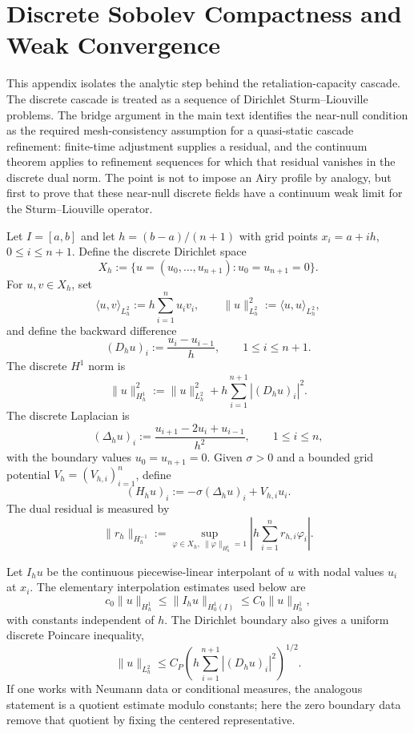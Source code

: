 
\section{Discrete Sobolev Compactness and Weak Convergence}
\label{app:discrete-cascade-compactness}

This appendix isolates the analytic step behind the retaliation-capacity
cascade.  The discrete cascade is treated as a sequence of Dirichlet
Sturm--Liouville problems.  The bridge argument in the main text identifies the
near-null condition as the required mesh-consistency assumption for a
quasi-static cascade refinement: finite-time adjustment supplies a residual, and
the continuum theorem applies to refinement sequences for which that residual
vanishes in the discrete dual norm.  The point is not to impose an Airy profile
by analogy, but first to prove that these near-null discrete fields have a
continuum weak limit for the Sturm--Liouville operator.

Let $I=[a,b]$ and let $h=(b-a)/(n+1)$ with grid points
$x_i=a+ih$, $0\le i\le n+1$.  Define the discrete Dirichlet space
\[
  X_h
  :=
  \{u=(u_0,\ldots,u_{n+1}) : u_0=u_{n+1}=0\}.
\]
For $u,v\in X_h$, set
\[
  \langle u,v\rangle_{L_h^2}
  :=
  h\sum_{i=1}^n u_i v_i,
  \qquad
  \|u\|_{L_h^2}^2
  :=
  \langle u,u\rangle_{L_h^2},
\]
and define the backward difference
\[
  (D_hu)_i := \frac{u_i-u_{i-1}}{h},
  \qquad 1\le i\le n+1.
\]
The discrete $H^1$ norm is
\[
  \|u\|_{H_h^1}^2
  :=
  \|u\|_{L_h^2}^2
  +
  h\sum_{i=1}^{n+1}|(D_hu)_i|^2 .
\]
The discrete Laplacian is
\[
  (\Delta_hu)_i
  :=
  \frac{u_{i+1}-2u_i+u_{i-1}}{h^2},
  \qquad 1\le i\le n,
\]
with the boundary values $u_0=u_{n+1}=0$.  Given $\sigma>0$ and a bounded
grid potential $V_h=(V_{h,i})_{i=1}^n$, define
\[
  (H_hu)_i := -\sigma(\Delta_hu)_i+V_{h,i}u_i.
\]
The dual residual is measured by
\[
  \|r_h\|_{H_h^{-1}}
  :=
  \sup_{\varphi\in X_h,\ \|\varphi\|_{H_h^1}=1}
  \left|
    h\sum_{i=1}^n r_{h,i}\varphi_i
  \right|.
\]

Let $I_hu$ be the continuous piecewise-linear interpolant of $u$ with nodal
values $u_i$ at $x_i$.  The elementary interpolation estimates used below are
\[
  c_0\|u\|_{H_h^1}
  \le
  \|I_hu\|_{H_0^1(I)}
  \le
  C_0\|u\|_{H_h^1},
  \tag{A.1}
\]
with constants independent of $h$.  The Dirichlet boundary also gives a
uniform discrete Poincare inequality,
\[
  \|u\|_{L_h^2}
  \le
  C_P
  \left(h\sum_{i=1}^{n+1}|(D_hu)_i|^2\right)^{1/2}.
  \tag{A.2}
\]
If one works with Neumann data or conditional measures, the analogous statement
is a quotient estimate modulo constants; here the zero boundary data remove
that quotient by fixing the centered representative.

